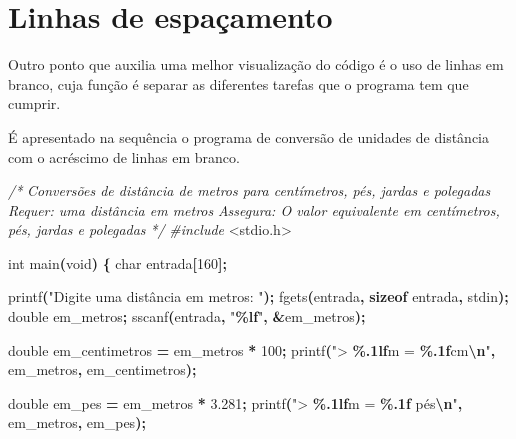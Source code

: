 \documentclass[
  11pt,
  a4paper,
]{scrbook}
\newenvironment{Shaded}{\begin{snugshade}}{\end{snugshade}}
\newcommand{\CommentTok}[1]{\textcolor[rgb]{0.56,0.35,0.01}{\textit{#1}}}
\newcommand{\DataTypeTok}[1]{\textcolor[rgb]{0.13,0.29,0.53}{#1}}
\newcommand{\DecValTok}[1]{\textcolor[rgb]{0.00,0.00,0.81}{#1}}
\newcommand{\FloatTok}[1]{\textcolor[rgb]{0.00,0.00,0.81}{#1}}
\newcommand{\ImportTok}[1]{#1}
\newcommand{\KeywordTok}[1]{\textcolor[rgb]{0.13,0.29,0.53}{\textbf{#1}}}
\newcommand{\NormalTok}[1]{#1}
\newcommand{\OperatorTok}[1]{\textcolor[rgb]{0.81,0.36,0.00}{\textbf{#1}}}
\newcommand{\PreprocessorTok}[1]{\textcolor[rgb]{0.56,0.35,0.01}{\textit{#1}}}
\newcommand{\SpecialCharTok}[1]{\textcolor[rgb]{0.81,0.36,0.00}{\textbf{#1}}}
\newcommand{\StringTok}[1]{\textcolor[rgb]{0.31,0.60,0.02}{#1}}
\begin{document}
\section{Linhas de espaçamento}\label{linhas-de-espauxe7amento}

Outro ponto que auxilia uma melhor visualização do código é o uso de
linhas em branco, cuja função é separar as diferentes tarefas que o
programa tem que cumprir.

É apresentado na sequência o programa de conversão de unidades de
distância com o acréscimo de linhas em branco.

\begin{Shaded}
\begin{Highlighting}[]
\CommentTok{/*}
\CommentTok{Conversões de distância de metros para centímetros, pés, jardas e polegadas}
\CommentTok{Requer: uma distância em metros}
\CommentTok{Assegura: O valor equivalente em centímetros, pés, jardas e polegadas}
\CommentTok{*/}
\PreprocessorTok{\#include }\ImportTok{\textless{}stdio.h\textgreater{}}

\DataTypeTok{int}\NormalTok{ main}\OperatorTok{(}\DataTypeTok{void}\OperatorTok{)} \OperatorTok{\{}
    \DataTypeTok{char}\NormalTok{ entrada}\OperatorTok{[}\DecValTok{160}\OperatorTok{];}

\NormalTok{    printf}\OperatorTok{(}\StringTok{"Digite uma distância em metros: "}\OperatorTok{);}
\NormalTok{    fgets}\OperatorTok{(}\NormalTok{entrada}\OperatorTok{,} \KeywordTok{sizeof}\NormalTok{ entrada}\OperatorTok{,}\NormalTok{ stdin}\OperatorTok{);}
    \DataTypeTok{double}\NormalTok{ em\_metros}\OperatorTok{;}
\NormalTok{    sscanf}\OperatorTok{(}\NormalTok{entrada}\OperatorTok{,} \StringTok{"}\SpecialCharTok{\%lf}\StringTok{"}\OperatorTok{,} \OperatorTok{\&}\NormalTok{em\_metros}\OperatorTok{);}

    \DataTypeTok{double}\NormalTok{ em\_centimetros }\OperatorTok{=}\NormalTok{ em\_metros }\OperatorTok{*} \DecValTok{100}\OperatorTok{;}
\NormalTok{    printf}\OperatorTok{(}\StringTok{"\textgreater{} }\SpecialCharTok{\%.1lf}\StringTok{m = }\SpecialCharTok{\%.1f}\StringTok{cm}\SpecialCharTok{\textbackslash{}n}\StringTok{"}\OperatorTok{,}\NormalTok{ em\_metros}\OperatorTok{,}\NormalTok{ em\_centimetros}\OperatorTok{);}

    \DataTypeTok{double}\NormalTok{ em\_pes }\OperatorTok{=}\NormalTok{ em\_metros }\OperatorTok{*} \FloatTok{3.281}\OperatorTok{;}
\NormalTok{    printf}\OperatorTok{(}\StringTok{"\textgreater{} }\SpecialCharTok{\%.1lf}\StringTok{m = }\SpecialCharTok{\%.1f}\StringTok{ pés}\SpecialCharTok{\textbackslash{}n}\StringTok{"}\OperatorTok{,}\NormalTok{ em\_metros}\OperatorTok{,}\NormalTok{ em\_pes}\OperatorTok{);}


\end{Highlighting}
\end{Shaded}
\end{document}
